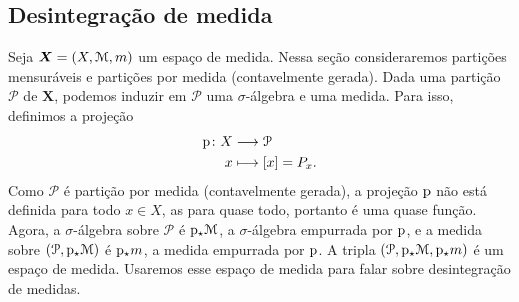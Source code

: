 





\subsection{Desintegração de medida}

Seja $\bm X=(X,\mathcal{M},m)$ um espaço de medida. Nessa seção consideraremos partições mensuráveis e partições por medida (contavelmente gerada). Dada uma partição $\mathcal P$ de $\bm X$, podemos induzir em $\mathcal P$ uma $\sigma$-álgebra e uma medida. Para isso, definimos a projeção
	\begin{align*}
	{\mathrm{p}}\colon {X} &\longrightarrow {\mathcal P} \\{x} &\longmapsto [x] = P_x.
	\end{align*}
Como $\mathcal P$ é partição por medida (contavelmente gerada), a projeção $\mathrm{p}$ não está definida para todo $x \in X$, as para quase todo, portanto é uma quase função. Agora, a $\sigma$-álgebra sobre $\mathcal P$ é $\mathrm{p}_\star \mathcal{M}$, a $\sigma$-álgebra empurrada por $\mathrm{p}$, e a medida sobre $(\mathcal P,\mathrm{p}_\star \mathcal{M})$ é $\mathrm{p}_\star m$, a medida empurrada por $\mathrm{p}$. A tripla $(\mathcal P,\mathrm{p}_\star\mathcal{M},\mathrm{p}_\star m)$ é um espaço de medida. Usaremos esse espaço de medida para falar sobre desintegração de medidas.

